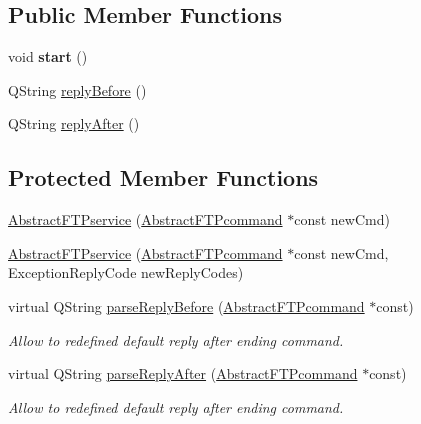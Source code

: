 \subsection*{Public Member Functions}
\begin{DoxyCompactItemize}
\item 
\mbox{\label{classAbstractFTPservice_a82d0f243f0e89dfd07f40d5d42adbb13}} 
void {\bfseries start} ()
\item 
Q\+String \hyperlink{classAbstractFTPservice_a48c4d339fde37882e48fc9e007184e2f}{reply\+Before} ()
\item 
Q\+String \hyperlink{classAbstractFTPservice_aa689acc6cb72ed5255a1ca407059be83}{reply\+After} ()
\end{DoxyCompactItemize}
\subsection*{Protected Member Functions}
\begin{DoxyCompactItemize}
\item 
\hyperlink{classAbstractFTPservice_acaddc197e13656887d4ee18f1119d755}{Abstract\+F\+T\+Pservice} (\hyperlink{classAbstractFTPcommand}{Abstract\+F\+T\+Pcommand} $\ast$const new\+Cmd)
\item 
\hyperlink{classAbstractFTPservice_ac420f6055d26efcd511d146a4e52155a}{Abstract\+F\+T\+Pservice} (\hyperlink{classAbstractFTPcommand}{Abstract\+F\+T\+Pcommand} $\ast$const new\+Cmd, Exception\+Reply\+Code new\+Reply\+Codes)
\item 
virtual Q\+String \hyperlink{classAbstractFTPservice_a3ac6c2518376864615d68199845d910a}{parse\+Reply\+Before} (\hyperlink{classAbstractFTPcommand}{Abstract\+F\+T\+Pcommand} $\ast$const)
\begin{DoxyCompactList}\small\item\em Allow to redefined default reply after ending command. \end{DoxyCompactList}\item 
virtual Q\+String \hyperlink{classAbstractFTPservice_a914cd7810f9e8e563dd0dd7bb34d4224}{parse\+Reply\+After} (\hyperlink{classAbstractFTPcommand}{Abstract\+F\+T\+Pcommand} $\ast$const)
\begin{DoxyCompactList}\small\item\em Allow to redefined default reply after ending command. \end{DoxyCompactList}\end{DoxyCompactItemize}



